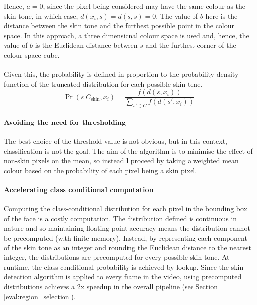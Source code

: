 Hence, $a=0$, since the pixel being considered may have the same colour as the skin tone, in which case, $d(x_i, s) = d(s, s) = 0$.
The value of $b$ here is the distance between the skin tone and the furthest possible point in the colour space.
In this approach, a three dimensional colour space is used and, hence, the value of $b$ is the Euclidean distance between $s$ and the furthest corner of the colour-space cube.
\\\\
Given this, the probability is defined in proportion to the probability density function of the truncated distribution for each possible skin tone.
\begin{equation*}
    \Pr(s|C_\mathrm{skin}, x_i) = \frac{f(d(s,x_i))}{\sum_{s' \in C}f(d(s',x_i))}
\end{equation*}
\paragraph{Avoiding the need for thresholding}
The best choice of the threshold value is not obvious, but in this context, classification is not the goal.
The aim of the algorithm is to minimise the effect of non-skin pixels on the mean, so instead I proceed by taking a weighted 
mean colour based on the probability of each pixel being a skin pixel. 

\paragraph{Accelerating class conditional computation}
Computing the class-conditional distribution for each pixel in the bounding box of the face is a costly computation. 
The distribution defined is continuous in nature and so maintaining floating point accuracy means the distribution cannot be precomputed (with finite memory).
Instead, by representing each component of the skin tone as an integer and rounding the Euclidean distance to the nearest integer, the distributions are precomputed 
for every possible skin tone. At runtime, the class conditional probability is achieved by lookup. Since the skin detection algorithm is applied to every frame in the video, 
using precomputed distributions achieves a 2x speedup in the overall pipeline (see Section \ref{eval:region_selection}).

